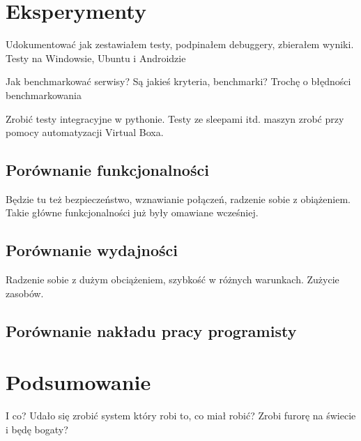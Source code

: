 \documentclass[twoside,a4paper]{book}
\begin{document}
\chapter{Eksperymenty}

Udokumentować jak zestawiałem testy, podpinałem debuggery, zbierałem wyniki.
Testy na Windowsie, Ubuntu i Androidzie

Jak benchmarkować serwisy? Są jakieś kryteria, benchmarki? Trochę o błędności benchmarkowania

Zrobić testy integracyjne w pythonie. Testy ze sleepami itd. maszyn zrobć przy pomocy automatyzacji Virtual Boxa.

\section{Porównanie funkcjonalności}
Będzie tu też bezpieczeństwo, wznawianie połączeń, radzenie sobie z obiążeniem. Takie główne funkcjonalności już były omawiane wcześniej.

\section{Porównanie wydajności}
Radzenie sobie z dużym obciążeniem, szybkość w różnych warunkach. Zużycie zasobów.

\section{Porównanie nakładu pracy programisty}


\chapter{Podsumowanie}
I co? Udało się zrobić system który robi to, co miał robić? Zrobi furorę na świecie i będę bogaty?

\backmatter

\listoffigures
\listoftables



\end{document}
